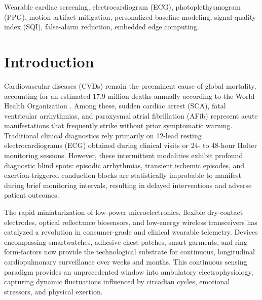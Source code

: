 \documentclass{ieeeaccess}
\begin{document}
\begin{keywords}
Wearable cardiac screening, electrocardiogram (ECG), photoplethysmogram (PPG), motion artifact mitigation, personalized baseline modeling, signal quality index (SQI), false-alarm reduction, embedded edge computing.
\end{keywords}

\titlepgskip=-15pt
\maketitle

\section{Introduction}
\label{sec:introduction}

Cardiovascular diseases (CVDs) remain the preeminent cause of global mortality, accounting for an estimated 17.9 million deaths annually according to the World Health Organization \cite{ref:ptbxl}. Among these, sudden cardiac arrest (SCA), fatal ventricular arrhythmias, and paroxysmal atrial fibrillation (AFib) represent acute manifestations that frequently strike without prior symptomatic warning. Traditional clinical diagnostics rely primarily on 12-lead resting electrocardiograms (ECG) obtained during clinical visits or 24- to 48-hour Holter monitoring sessions. However, these intermittent modalities exhibit profound diagnostic blind spots: episodic arrhythmias, transient ischemic episodes, and exertion-triggered conduction blocks are statistically improbable to manifest during brief monitoring intervals, resulting in delayed interventions and adverse patient outcomes.

The rapid miniaturization of low-power microelectronics, flexible dry-contact electrodes, optical reflectance biosensors, and low-energy wireless transceivers has catalyzed a revolution in consumer-grade and clinical wearable telemetry. Devices encompassing smartwatches, adhesive chest patches, smart garments, and ring form-factors now provide the technological substrate for continuous, longitudinal cardiopulmonary surveillance over weeks and months. This continuous sensing paradigm provides an unprecedented window into ambulatory electrophysiology, capturing dynamic fluctuations influenced by circadian cycles, emotional stressors, and physical exertion.
\end{document}
